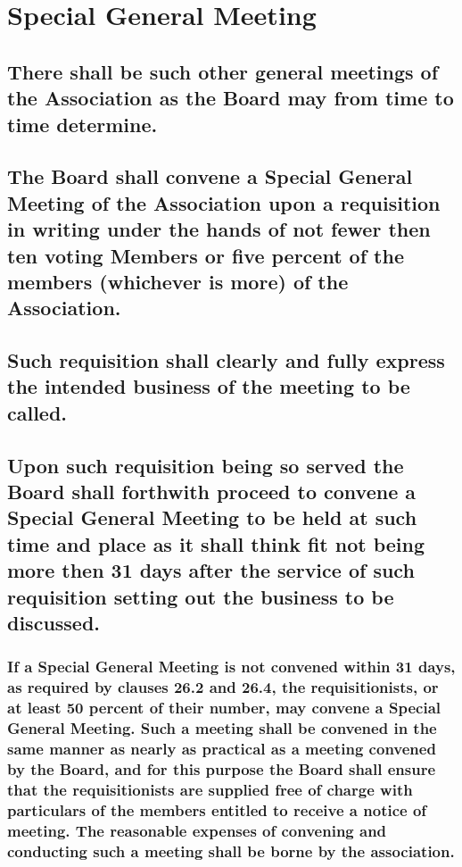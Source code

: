 \documentclass{article}
\newenvironment{subs}
  {\adjustwidth{2em}{0pt}}
  {\endadjustwidth}
\begin{document}
\section{Special General Meeting}
\begin{subs}
\subsection{There shall be such other general meetings of the Association as the Board may from time to time determine.}
\subsection{The Board shall convene a Special General Meeting of the Association upon a requisition in writing under the hands of not fewer then ten voting Members or five percent of the members (whichever is more) of the Association.}
\subsection{Such requisition shall clearly and fully express the intended business of the meeting to be called.}
\subsection{Upon such requisition being so served the Board shall forthwith proceed to convene a Special General Meeting to be held at such time and place as it shall think fit not being more then 31 days after the service of such requisition setting out the business to be discussed.}
\subsubsection{If a Special General Meeting is not convened within 31 days, as required by clauses 26.2 and 26.4, the requisitionists, or at least 50 percent of their number, may convene a Special General Meeting. Such a meeting shall be convened in the same manner as nearly as practical as a meeting convened by the Board, and for this purpose the Board shall ensure that the requisitionists are supplied free of charge with particulars of the members entitled to receive a notice of meeting. The reasonable expenses of convening and conducting such a meeting shall be borne by the association.}
\end{subs}
\end{document}
